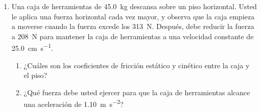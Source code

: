 \documentclass[Física - Práctica.root.tex]{subfiles}
\begin{document}
\begin{enumerate}
  \item Una caja de herramientas de \SI{45,0}{\kilogram} descansa sobre un piso horizontal. Usted le aplica
        una fuerza horizontal cada vez mayor, y observa que la caja empieza a moverse cuando la
        fuerza excede los \SI{313}{\newton}. Después, debe reducir la fuerza a \SI{208}{\newton} para mantener la caja de
        herramientas a una velocidad constante de \SI[per-mode=symbol]{25,0}{\centi\meter\per\second}.
        \begin{enumerate}
          \item ¿Cuáles son los coeficientes de fricción estático y cinético entre la caja y el piso?
          \item ¿Qué fuerza debe usted ejercer para que la caja de herramientas alcance una aceleración de \SI[per-mode=symbol]{1,10}{\meter\per\second\squared}?
        \end{enumerate}
\end{enumerate}
\end{document}
